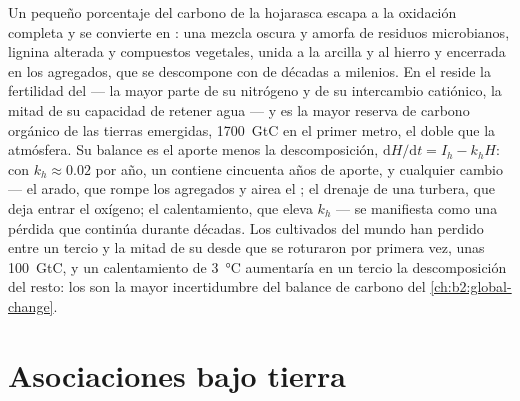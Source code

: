 \begin{proposition}\label{prop:b2:living-soil:humus}
Un pequeño porcentaje del carbono de la hojarasca escapa a la oxidación
completa y se convierte en \emph{}: una mezcla oscura y amorfa de
residuos microbianos, lignina alterada y compuestos vegetales, unida a la
arcilla y al hierro y encerrada en los agregados, que se descompone con
 de décadas a milenios. En el  reside la
fertilidad del 
--- la mayor parte de su nitrógeno y de su intercambio catiónico, la mitad
de su capacidad de retener agua --- y es la mayor reserva de carbono
orgánico de las tierras emergidas,
\qty{1700}{GtC} en el primer metro, el doble que la atmósfera. Su
balance es el aporte menos la descomposición, $\mathrm{d}H/\mathrm{d}t = I_h - k_hH$:
con $k_h \approx 0.02$ por año, un  contiene cincuenta años de aporte,
y cualquier cambio --- el arado, que rompe los agregados y airea el ;
el drenaje de una turbera, que deja entrar el oxígeno; el calentamiento,
que eleva $k_h$ --- se manifiesta como una pérdida que continúa durante
décadas. Los  cultivados del mundo han perdido entre un tercio y la
mitad de su  desde que se roturaron por primera vez, unas
\qty{100}{GtC}, y un calentamiento de \qty{3}{\celsius} aumentaría en un
tercio la descomposición del resto: los  son la mayor incertidumbre
del balance de carbono del \cref{ch:b2:global-change}.
\end{proposition}

\section{Asociaciones bajo tierra}

